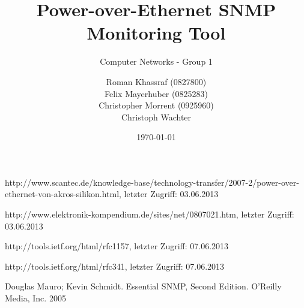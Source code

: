 \documentclass[a4paper, 12pt]{scrartcl}
\title{Power-over-Ethernet SNMP Monitoring Tool}
\subtitle{Computer Networks - Group 1}
\author{Roman Khassraf (0827800)\\ Felix Mayerhuber (0825283) \\ Christopher Morrent (0925960) \\ Christoph Wachter }
\date{\today}
\begin{document}
\maketitle







\begin{thebibliography}{4}

 http://www.scantec.de/knowledge-base/technology-transfer/2007-2/power-over-ethernet-von-akros-silikon.html, letzter Zugriff: 03.06.2013

 http://www.elektronik-kompendium.de/sites/net/0807021.htm, letzter Zugriff: 03.06.2013

 http://tools.ietf.org/html/rfc1157, letzter Zugriff: 07.06.2013

 http://tools.ietf.org/html/rfc341, letzter Zugriff: 07.06.2013

 Douglas Mauro; Kevin Schmidt. Essential SNMP, Second Edition. O'Reilly Media, Inc. 2005

\end{thebibliography}
\end{document}

